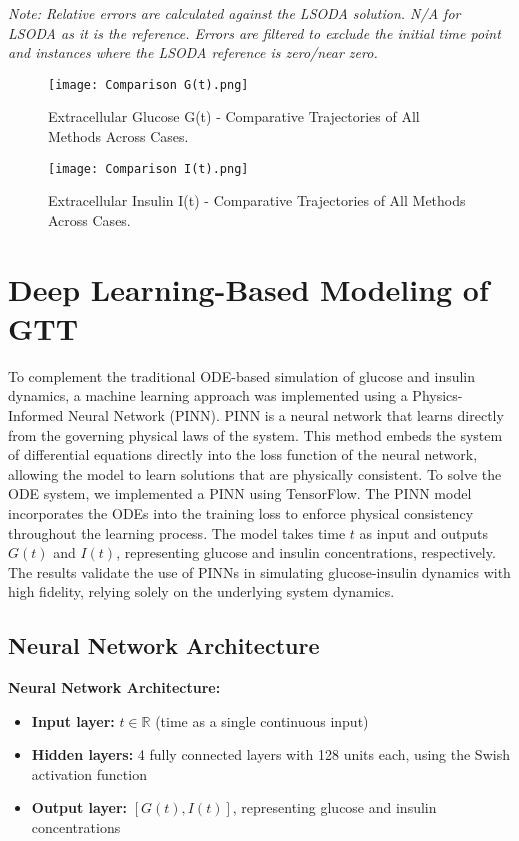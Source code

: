 \documentclass[conference]{IEEEtran}
\begin{document}
\vspace{0.5em}
\noindent \small \textit{Note: Relative errors are calculated against the LSODA solution. N/A for LSODA as it is the reference. Errors are filtered to exclude the initial time point and instances where the LSODA reference is zero/near zero.}
\vspace{0.5em}

\begin{figure}[H]
    \centering
    \texttt{[image: Comparison G(t).png]} %
    \caption{Extracellular Glucose G(t) - Comparative Trajectories of All Methods Across Cases.}
    \label{fig:comparison_glucose}
\end{figure}
\begin{figure}[H]
    \centering
    \texttt{[image: Comparison I(t).png]} %
    \caption{Extracellular Insulin I(t) - Comparative Trajectories of All Methods Across Cases.}
    \label{fig:comparison_insulin}
\end{figure}

\section{Deep  Learning-Based Modeling of GTT}

To complement the traditional ODE-based simulation of glucose and insulin dynamics, a machine learning approach was implemented using a Physics-Informed Neural Network (PINN).
PINN is a neural network that learns directly from the governing physical laws of the system. This method embeds the system of differential equations directly into the loss function of the neural network, allowing the model to learn solutions that are physically consistent.
To solve the ODE system, we implemented a PINN using TensorFlow. The PINN model incorporates the ODEs into the training loss to enforce physical consistency throughout the learning process. The model takes time 
$t$ as input and outputs $G(t)$ and $I(t)$, representing glucose and insulin concentrations, respectively. The results validate the use of PINNs in simulating glucose-insulin dynamics with high fidelity, relying solely on the underlying system dynamics.
\vspace{0.3cm}
\subsection{Neural Network Architecture}

\textbf{Neural Network Architecture:}
\begin{itemize}
    \item \textbf{Input layer:} $t \in \mathbb{R}$ (time as a single continuous input)
    \item \textbf{Hidden layers:} 4 fully connected layers with 128 units each, using the Swish activation function
    \item \textbf{Output layer:} $[G(t), I(t)]$, representing glucose and insulin concentrations
\end{itemize}
\end{document}
